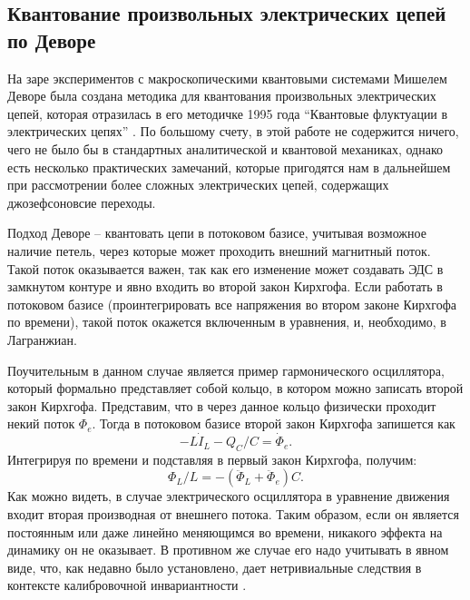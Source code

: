 \documentclass[14pt, a4paper]{extreport}
\numberwithin{equation}{section}
\begin{document}
\subsection{Квантование произвольных электрических цепей по Деворе}

На заре экспериментов с макроскопическими квантовыми системами Мишелем Деворе была создана методика для квантования произвольных электрических цепей, которая отразилась в его методичке 1995 года ``Квантовые флуктуации в электрических цепях'' \cite{devoret1995quantum}. По большому счету, в этой работе не содержится ничего, чего не было бы в стандартных аналитической и квантовой механиках, однако есть несколько практических замечаний, которые пригодятся нам в дальнейшем при рассмотрении более сложных электрических цепей, содержащих джозефсоновсие переходы.

Подход Деворе -- квантовать цепи в потоковом базисе, учитывая возможное наличие петель, через которые может проходить внешний магнитный поток. Такой поток оказывается важен, так как его изменение может создавать ЭДС в замкнутом контуре и явно входить во второй закон Кирхгофа. Если работать в потоковом базисе (проинтегрировать все напряжения во втором законе Кирхгофа по времени), такой поток окажется включенным в уравнения, и, необходимо, в Лагранжиан. 

Поучительным в данном случае является пример гармонического осциллятора, который формально представляет собой кольцо, в котором можно записать второй закон Кирхгофа. Представим, что в через данное кольцо физически проходит некий поток $\Phi_e$. Тогда в потоковом базисе второй закон Кирхгофа запишется как
\begin{equation}
	-L\dot I_L - Q_C/C = \dot \Phi_e.
\end{equation}
Интегрируя по времени и подставляя в первый закон Кирхгофа, получим:
\begin{equation}
	\Phi_L/L = - (\ddot \Phi_L + \ddot \Phi_e)C.
\end{equation}
Как можно видеть, в случае электрического осциллятора в уравнение движения входит вторая производная от внешнего потока. Таким образом, если он является постоянным или даже линейно меняющимся во времени, никакого эффекта на динамику он не оказывает. В противном же случае его надо учитывать в явном виде, что, как недавно было установлено, дает нетривиальные следствия в контексте калибровочной инвариантности \cite{you2019circuit,riwar2021circuit}.
\end{document}
